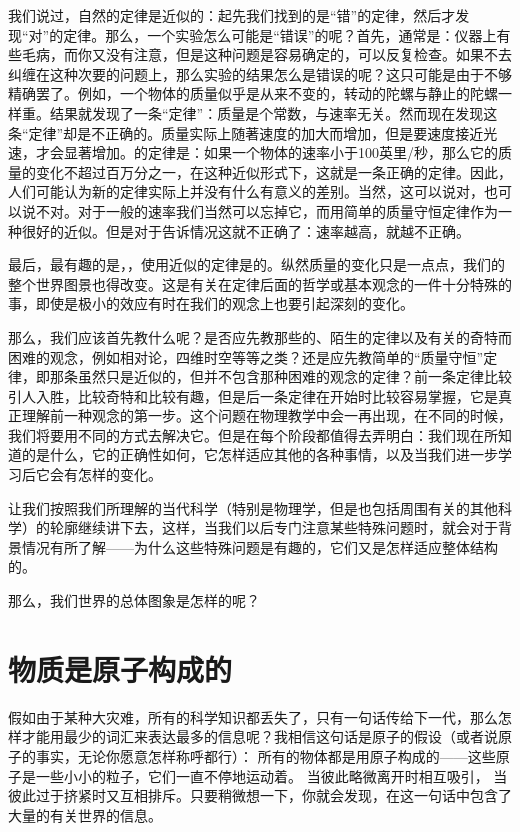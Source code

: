 我们说过，自然的定律是近似的：起先我们找到的是“错”的定律，然后才发现“对”的定律。那么，一个实验怎么可能是“错误”的呢？首先，通常是：仪器上有些毛病，而你又没有注意，但是这种问题是容易确定的，可以反复检查。如果不去纠缠在这种次要的问题上，那么实验的结果怎么是错误的呢？这只可能是由于不够精确罢了。例如，一个物体的质量似乎是从来不变的，转动的陀螺与静止的陀螺一样重。结果就发现了一条“定律”：质量是个常数，与速率无关。然而现在发现这条“定律”却是不正确的。质量实际上随著速度的加大而增加，但是要速度接近光速，才会显著增加。的定律是：如果一个物体的速率小于100英里/秒，那么它的质量的变化不超过百万分之一，在这种近似形式下，这就是一条正确的定律。因此，人们可能认为新的定律实际上并没有什么有意义的差别。当然，这可以说对，也可以说不对。对于一般的速率我们当然可以忘掉它，而用简单的质量守恒定律作为一种很好的近似。但是对于告诉情况这就不正确了：速率越高，就越不正确。

最后，最有趣的是，，使用近似的定律是的。纵然质量的变化只是一点点，我们的整个世界图景也得改变。这是有关在定律后面的哲学或基本观念的一件十分特殊的事，即使是极小的效应有时在我们的观念上也要引起深刻的变化。

那么，我们应该首先教什么呢？是否应先教那些的、陌生的定律以及有关的奇特而困难的观念，例如相对论，四维时空等等之类？还是应先教简单的“质量守恒”定律，即那条虽然只是近似的，但并不包含那种困难的观念的定律？前一条定律比较引人入胜，比较奇特和比较有趣，但是后一条定律在开始时比较容易掌握，它是真正理解前一种观念的第一步。这个问题在物理教学中会一再出现，在不同的时候，我们将要用不同的方式去解决它。但是在每个阶段都值得去弄明白：我们现在所知道的是什么，它的正确性如何，它怎样适应其他的各种事情，以及当我们进一步学习后它会有怎样的变化。

让我们按照我们所理解的当代科学（特别是物理学，但是也包括周围有关的其他科学）的轮廓继续讲下去，这样，当我们以后专门注意某些特殊问题时，就会对于背景情况有所了解——为什么这些特殊问题是有趣的，它们又是怎样适应整体结构的。

那么，我们世界的总体图象是怎样的呢？

\section{物质是原子构成的}

假如由于某种大灾难，所有的科学知识都丢失了，只有一句话传给下一代，那么怎样才能用最少的词汇来表达最多的信息呢？我相信这句话是原子的假设（或者说原子的事实，无论你愿意怎样称呼都行）： 所有的物体都是用原子构成的——这些原子是一些小小的粒子，它们一直不停地运动着。 当彼此略微离开时相互吸引， 当彼此过于挤紧时又互相排斥。只要稍微想一下，你就会发现，在这一句话中包含了大量的有关世界的信息。

